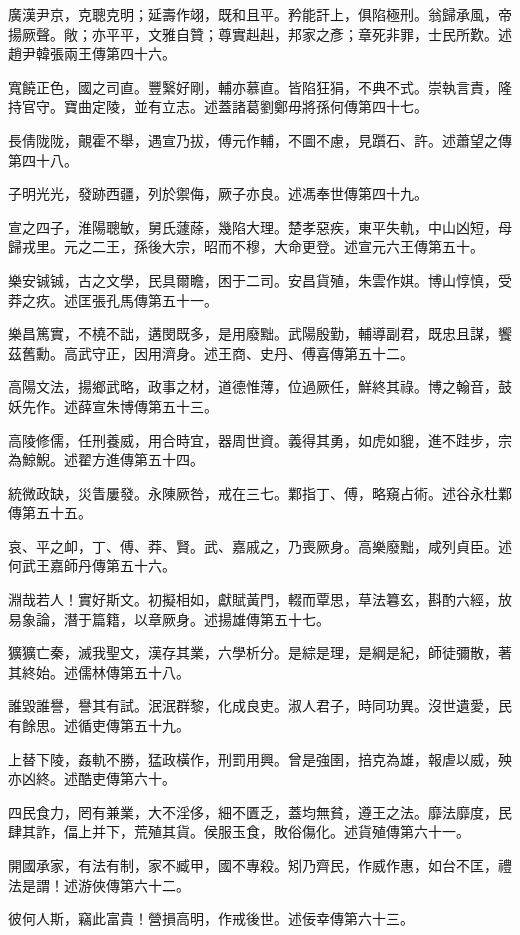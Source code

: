 \begin{pinyinscope}
廣漢尹京，克聰克明；延壽作翊，既和且平。矜能訐上，俱陷極刑。翁歸承風，帝揚厥聲。敞；亦平平，文雅自贊；尊實赳赳，邦家之彥；章死非罪，士民所歎。述趙尹韓張兩王傳第四十六。

寬饒正色，國之司直。豐繄好剛，輔亦慕直。皆陷狂狷，不典不式。崇執言責，隆持官守。寶曲定陵，並有立志。述蓋諸葛劉鄭毋將孫何傳第四十七。

長倩陇陇，覿霍不舉，遇宣乃拔，傅元作輔，不圖不慮，見躓石、許。述蕭望之傳第四十八。

子明光光，發跡西疆，列於禦侮，厥子亦良。述馮奉世傳第四十九。

宣之四子，淮陽聰敏，舅氏蘧蒢，幾陷大理。楚孝惡疾，東平失軌，中山凶短，母歸戎里。元之二王，孫後大宗，昭而不穆，大命更登。述宣元六王傳第五十。

樂安铖铖，古之文學，民具爾瞻，困于二司。安昌貨殖，朱雲作娸。博山惇慎，受莽之疚。述匡張孔馬傳第五十一。

樂昌篤實，不橈不詘，遘閔既多，是用廢黜。武陽殷勤，輔導副君，既忠且謀，饗茲舊勳。高武守正，因用濟身。述王商、史丹、傅喜傳第五十二。

高陽文法，揚鄉武略，政事之材，道德惟薄，位過厥任，鮮終其祿。博之翰音，鼓妖先作。述薛宣朱博傳第五十三。

高陵修儒，任刑養威，用合時宜，器周世資。義得其勇，如虎如貔，進不跬步，宗為鯨鯢。述翟方進傳第五十四。

統微政缺，災眚屢發。永陳厥咎，戒在三七。鄴指丁、傅，略窺占術。述谷永杜鄴傳第五十五。

哀、平之卹，丁、傅、莽、賢。武、嘉戚之，乃喪厥身。高樂廢黜，咸列貞臣。述何武王嘉師丹傳第五十六。

淵哉若人！實好斯文。初擬相如，獻賦黃門，輟而覃思，草法篹玄，斟酌六經，放易象論，潛于篇籍，以章厥身。述揚雄傳第五十七。

獷獷亡秦，滅我聖文，漢存其業，六學析分。是綜是理，是綱是紀，師徒彌散，著其終始。述儒林傳第五十八。

誰毀誰譽，譽其有試。泯泯群黎，化成良吏。淑人君子，時同功異。沒世遺愛，民有餘思。述循吏傳第五十九。

上替下陵，姦軌不勝，猛政橫作，刑罰用興。曾是強圉，掊克為雄，報虐以威，殃亦凶終。述酷吏傳第六十。

四民食力，罔有兼業，大不淫侈，細不匱乏，蓋均無貧，遵王之法。靡法靡度，民肆其詐，偪上并下，荒殖其貨。侯服玉食，敗俗傷化。述貨殖傳第六十一。

開國承家，有法有制，家不臧甲，國不專殺。矧乃齊民，作威作惠，如台不匡，禮法是謂！述游俠傳第六十二。

彼何人斯，竊此富貴！營損高明，作戒後世。述佞幸傳第六十三。


\end{pinyinscope}
